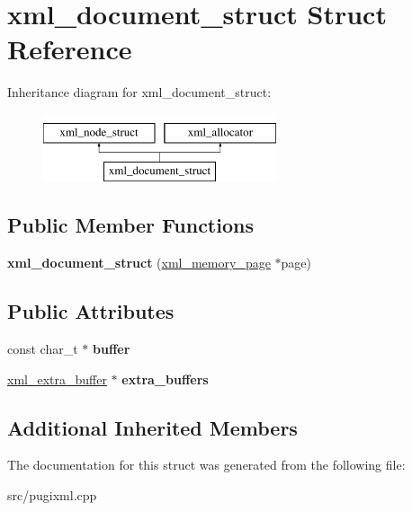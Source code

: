 \hypertarget{structxml__document__struct}{}\section{xml\+\_\+document\+\_\+struct Struct Reference}
\label{structxml__document__struct}
Inheritance diagram for xml\+\_\+document\+\_\+struct\+:\begin{figure}[H]
\begin{center}
\leavevmode
\includegraphics[height=2.000000cm]{structxml__document__struct}
\end{center}
\end{figure}
\subsection*{Public Member Functions}
\begin{DoxyCompactItemize}
\item 
\mbox{\label{structxml__document__struct_aea3482436c20abd98ca063c3bd5dcfba}} 
{\bfseries xml\+\_\+document\+\_\+struct} (\hyperlink{structxml__memory__page}{xml\+\_\+memory\+\_\+page} $\ast$page)
\end{DoxyCompactItemize}
\subsection*{Public Attributes}
\begin{DoxyCompactItemize}
\item 
\mbox{\label{structxml__document__struct_a120451f29b8cc2a82a3ecc926449ea0e}} 
const char\+\_\+t $\ast$ {\bfseries buffer}
\item 
\mbox{\label{structxml__document__struct_afe3b1efd5b683c306157244496f55c4b}} 
\hyperlink{structxml__extra__buffer}{xml\+\_\+extra\+\_\+buffer} $\ast$ {\bfseries extra\+\_\+buffers}
\end{DoxyCompactItemize}
\subsection*{Additional Inherited Members}


The documentation for this struct was generated from the following file\+:\begin{DoxyCompactItemize}
\item 
src/pugixml.\+cpp\end{DoxyCompactItemize}
